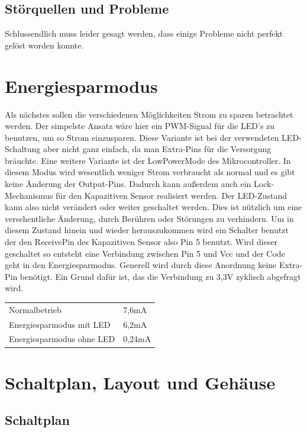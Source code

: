 \documentclass[a4paper,
DIV=13,
12pt,
BCOR=10mm,
department=FakEI,
parskip=half,
automark,
]{article}
\begin{document}
\subsection{Störquellen und Probleme}
Schlussendlich muss leider gesagt werden, dass einige Probleme nicht perfekt gelöst worden konnte. 



\newpage
\section{Energiesparmodus}
\label{Energie}
Als nächstes sollen die verschiedenen Möglichkeiten Strom zu sparen betrachtet werden. Der simpelste Ansatz wäre hier ein PWM-Signal für die LED's zu benutzen, um so Strom einzusparen. Diese Variante ist bei der verwendeten LED-Schaltung aber nicht ganz einfach, da man Extra-Pins für die Versorgung bräuchte. Eine weitere Variante ist der LowPowerMode des Mikrocontroller. In diesem Modus wird wesentlich weniger Strom verbraucht als normal und es gibt keine Änderung der Output-Pins. Dadurch kann außerdem auch ein Lock-Mechanismus für den Kapazitiven Sensor realisiert werden. Der LED-Zustand kann also nicht verändert oder weiter geschaltet werden. Dies ist nützlich um eine versehentliche Änderung, durch Berühren oder Störungen zu verhindern. Um in diesem Zustand hinein und wieder herauszukommen wird ein Schalter benutzt der den ReceivePin des Kapazitiven Sensor also Pin 5 benutzt. Wird dieser geschaltet so entsteht eine Verbindung zwischen Pin 5 und Vcc und der Code geht in den Energiesparmodus. Generell wird durch diese Anordnung keine Extra-Pin benötigt. Ein Grund dafür ist, das die Verbindung zu 3,3V zyklisch abgefragt wird.

\begin{center}
\begin{tabularx}{\columnwidth}{XX}
Normalbetrieb & 7,6mA \\ 
Energiesparmodus mit LED & 6,2mA\\
Energiesparmodus ohne LED & 0,24mA
\label{tab:ADEinton}
\end{tabularx}
\end{center}





\newpage
\section{Schaltplan, Layout und Gehäuse}
\subsection{Schaltplan}
\end{document}
